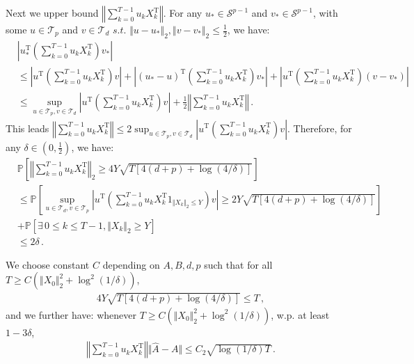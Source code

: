 \documentclass{article}
\theoremstyle{definition}
\begin{document}
Next we upper bound $\left\Vert\sum_{k=0}^{T-1}u_{k}X^{\mathrm{T}}_{k}\right\Vert$. For any $u_{*}\in\mathcal{S}^{p-1}$ and $v_{*}\in\mathcal{S}^{p-1}$, with some $u\in\mathcal{T}_{p}$ and $v\in\mathcal{T}_{d}$ $s.t.$ $\Vert u-u_{*}\Vert _{2},\Vert v-v_{*}\Vert _{2}\leq \frac{1}{2}$, we have:
\begin{align*}
&\left\vert u_{*}^{\mathrm{T}}(\sum_{k=0}^{T-1}u_{k}X^{\mathrm{T}}_{k})v_{*}\right\vert\\
&\leq\left\vert u^{\mathrm{T}}(\sum_{k=0}^{T-1}u_{k}X^{\mathrm{T}}_{k})v\right\vert+\left\vert(u_{*}-u)^{\mathrm{T}}(\sum_{k=0}^{T-1}u_{k}X^{\mathrm{T}}_{k})v_{*}\right\vert+\left\vert u^{\mathrm{T}}(\sum_{k=0}^{T-1}u_{k}X^{\mathrm{T}}_{k})(v-v_{*})\right\vert\\
&\leq \sup_{u\in \mathcal{T}_{p},v\in\mathcal{T}_{d}}\left\vert u^{\mathrm{T}}(\sum_{k=0}^{T-1}u_{k}X^{\mathrm{T}}_{k})v\right\vert +\frac{1}{2}\left\Vert\sum_{k=0}^{T-1}u_{k}X^{\mathrm{T}}_{k}\right\Vert\,.
\end{align*}
This leads $\left\Vert\sum_{k=0}^{T-1}u_{k}X^{\mathrm{T}}_{k}\right\Vert\leq 2\sup_{u\in \mathcal{T}_{p},v\in\mathcal{T}_{d}}\left\vert u^{\mathrm{T}}(\sum_{k=0}^{T-1}u_{k}X^{\mathrm{T}}_{k})v\right\vert$. Therefore, for any $\delta\in(0,\frac{1}{2})$, we have:
\begin{align*}
&\mathbb{P}\left[\left\Vert\sum_{k=0}^{T-1}u_{k}X^{\mathrm{T}}_{k}\right\Vert_{2}\geq 4Y\sqrt{T[4(d+p)+\log(4/\delta)]}\right]\\
&\leq \mathbb{P}\left[\sup_{u\in\mathcal{T}_{d},v\in\mathcal{T}_{p}}\left\vert u^{\mathrm{T}}\left(\sum_{k=0}^{T-1}u_{k}X^{\mathrm{T}}_{k}1_{\Vert X_{k}\Vert_{2}\leq Y}\right)v\right\vert\geq 2Y\sqrt{T[4(d+p)+\log(4/\delta)]}\right]\\
&+\mathbb{P}\left[\exists\,0\leq k\leq T-1, \Vert X_{k}\Vert _{2}\geq Y\right]\\
&\leq 2\delta\,.
\end{align*}

We choose constant $C$ depending on $A,B,d,p$ such that for all $T\geq C\left(\Vert X_{0}\Vert ^{2}_{2}+\log^{2}(1/\delta)\right)$, 
\begin{align*}
4Y\sqrt{T[4(d+p)+\log(4/\delta)]}\leq T\,, 
\end{align*}
and we further have: whenever $T\geq C\left(\Vert X_{0}\Vert ^{2}_{2}+\log^{2}(1/\delta)\right)$, w.p. at least $1-3\delta$,
\begin{align*}
\left\Vert\sum_{k=0}^{T-1}u_{k}X^{\mathrm{T}}_{k}\right\Vert\Vert \hat{A}-A\Vert \leq C_{2}\sqrt{\log(1/\delta)T}\,.
\end{align*}
\end{document}
